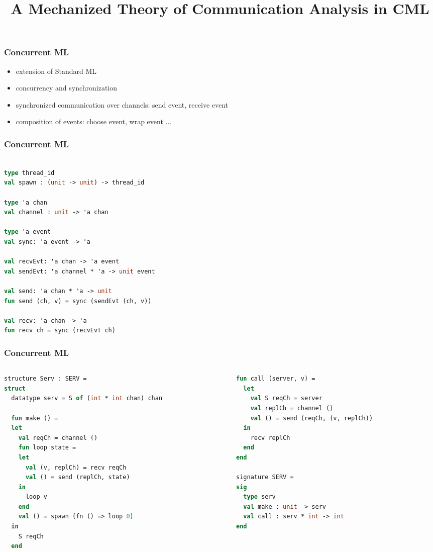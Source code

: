 \documentclass{beamer}
\title{A Mechanized Theory of Communication Analysis in CML}
\begin{document}
\begin{frame}
  \titlepage
\end{frame}

\begin{frame}
\frametitle{Concurrent ML}
\begin{itemize}
\item extension of Standard ML
\item concurrency and synchronization
\item synchronized communication over channels: send event, receive event
\item composition of events: choose event, wrap event ...
\end{itemize}
\end{frame}

\begin{frame}[fragile]
\frametitle{Concurrent ML}
\begin{lstlisting}[language=ML]

type thread_id
val spawn : (unit -> unit) -> thread_id

type 'a chan
val channel : unit -> 'a chan

type 'a event
val sync: 'a event -> 'a

val recvEvt: 'a chan -> 'a event
val sendEvt: 'a channel * 'a -> unit event

val send: 'a chan * 'a -> unit
fun send (ch, v) = sync (sendEvt (ch, v))

val recv: 'a chan -> 'a
fun recv ch = sync (recvEvt ch)

\end{lstlisting}
\end{frame}


\begin{frame}[fragile]
	\frametitle{Concurrent ML}
\begin{columns}
\begin{column}{0.5\textwidth}
\begin{lstlisting}[language=ML, mathescape]
structure Serv : SERV =
struct 
  datatype serv = S of (int * int chan) chan

  fun make () =
  let 
    val reqCh = channel ()
    fun loop state =
    let
      val (v, replCh) = recv reqCh
      val () = send (replCh, state)
    in
      loop v
    end
    val () = spawn (fn () => loop 0)
  in
    S reqCh
  end 
\end{lstlisting}
\end{column}


\begin{column}{0.5\textwidth}
\begin{lstlisting}[language=ML, mathescape]
  fun call (server, v) =
  let 
    val S reqCh = server
    val replCh = channel () 
    val () = send (reqCh, (v, replCh))
  in
    recv replCh
  end
end

signature SERV =
sig 
  type serv
  val make : unit -> serv
  val call : serv * int -> int
end
\end{lstlisting}
\end{column}
\end{columns}
\end{frame}
\end{document}

